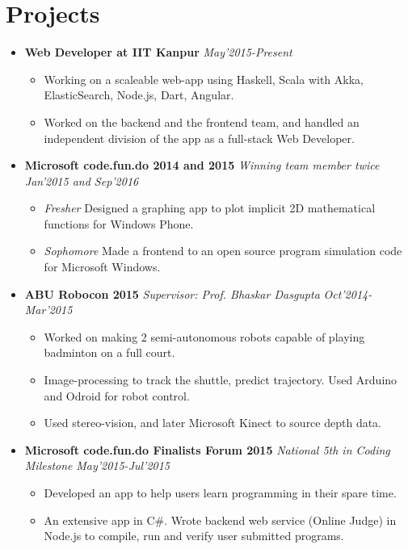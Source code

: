\documentclass[11pt,a4paper]{article}
\begin{document}
\section*{Projects}
\vspace{-0.2cm}
\begin{itemize}

\item \textbf{\large{Web Developer at IIT Kanpur}} \hfill\textit{May'2015-Present}
  \begin{itemize}[leftmargin=*]
    \setlength\itemsep{0em}
    \item Working on a scaleable web-app using Haskell, Scala with Akka, ElasticSearch, Node.js, Dart, Angular.
    \item Worked on the backend and the frontend team, and handled an independent division of the app as a full-stack Web Developer.
  \end{itemize}

\vspace{0.1cm}
\item \textbf{\large{Microsoft code.fun.do 2014 and 2015}} \emph{Winning team member twice} \hfill\textit{Jan'2015 and Sep'2016}
  \begin{itemize}[leftmargin=*]
    \setlength\itemsep{0em}
    \item \textit{Fresher} Designed a graphing app to plot implicit 2D mathematical functions for Windows Phone.
    \item \textit{Sophomore} Made a frontend to an open source program simulation code for Microsoft Windows.
    \end{itemize}

\vspace{0.1cm}
\item \textbf{\large{ABU Robocon 2015}} \emph{Supervisor: Prof. Bhaskar Dasgupta} \hfill\textit{Oct'2014-Mar'2015}
  \begin{itemize}[leftmargin=*]
    \setlength\itemsep{0em}
    \item Worked on making 2 semi-autonomous robots capable of playing badminton on a full court.
    \item Image-processing to track the shuttle, predict trajectory. Used Arduino and Odroid for robot control.
    \item Used stereo-vision, and later Microsoft Kinect to source depth data.
    \end{itemize}

\vspace{0.1cm}
\item \textbf{\large{Microsoft code.fun.do Finalists Forum 2015}} \emph{National 5th in Coding Milestone} \hfill\textit{May'2015-Jul'2015}
  \begin{itemize}[leftmargin=*]
    \setlength\itemsep{0em}
    \item Developed an app to help users learn programming in their spare time.
    \item An extensive app in C\#. Wrote backend web service (Online Judge) in Node.js to compile, run and verify user submitted programs.
    \end{itemize}
\end{itemize}
\end{document}
